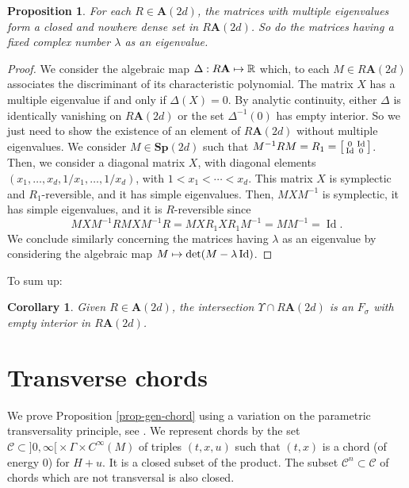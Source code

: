 \documentclass[JEP,XML,SOM,Unicode,published]{cedram}
\newcommand\mto{\mathchoice{\longmapsto}{\mapsto}{\mapsto}{\mapsto}}
\newenvironment{smallbmatrix}{\big[\begin{smallmatrix}}{\end{smallmatrix}\big]}
\DeclareMathOperator{\Id}{Id}
\newcommand{\Rm}{\mathbb{R}}
\newcommand{\mC}{\ensuremath{\mathcal{C}}}
\newcommand{\Sp}{\mathbf{Sp}}
\newcommand{\A}{\mathbf{A}}
\theoremstyle{plain}
\newtheorem{cor}[lem]{Corollary}
\newtheorem{prop}[lem]{Proposition}
\theoremstyle{definition}
\begin{document}
\begin{prop}\label{prop-gen}
For each $R\in \A(2d)$, the matrices with multiple eigenvalues form a closed and nowhere dense set in $R\A(2d)$. So do the matrices having a fixed complex number $\lambda$ as an eigenvalue.
\end{prop}

\begin{proof}
We consider the algebraic map $\Delta: R\A\mto \Rm$ which, to each $M\in R\A(2d)$ associates the discriminant of its characteristic polynomial. The matrix $X$ has a multiple eigenvalue if and only if $\Delta(X)=0$.
By analytic continuity, either $\Delta$ is identically vanishing on $R\A(2d)$ or the set $\Delta^{-1}(0)$ has empty interior.
So we just need to show the existence of an element of $R\A(2d)$ without multiple eigenvalues.
We consider $M\in \Sp(2d)$ such that
$M^{-1}RM=R_1=
\begin{smallbmatrix} 0&\Id\\\Id&0\end{smallbmatrix}
$.
Then, we consider a diagonal matrix $X$, with diagonal elements $(x_1, \ldots, x_d, 1/x_1, \ldots, 1/x_d)$,
with $1<x_1< \cdots <x_d$. This matrix $X$ is symplectic and $R_1$-reversible, and it has simple eigenvalues.
Then, $MXM^{-1}$ is symplectic, it has simple eigenvalues, and it is $R$-reversible since
\[
MXM^{-1}RMXM^{-1}R=MXR_1XR_1M^{-1}=MM^{-1}=\Id.
\]
We conclude similarly concerning the matrices having $\lambda$ as an eigenvalue by considering the algebraic map $M\mto \det (M-\lambda \Id)$.
\end{proof}

To sum up:

\begin{cor} \label{cor-RA}
Given $R\in \A(2d)$, the intersection $\Upsilon\cap R\A(2d)$ is an $F_{\sigma}$ with empty interior in $R\A(2d)$.
\end{cor}

\section{Transverse chords}\label{sec-tc}
We prove Proposition \ref{prop-gen-chord} using a variation on the parametric transversality principle, see \cite{A63}.
We represent chords by the set $\mC\subset ]0,\infty[{}\times \Gamma\times C^{\infty}(M)$ of triples $(t,x,u)$
such that $(t,x)$ is a chord (of energy $0$) for $H+u$. It is a closed subset of the product. The subset $\mC^n\subset\mC$ of chords which are not transversal is also closed.
\end{document}
